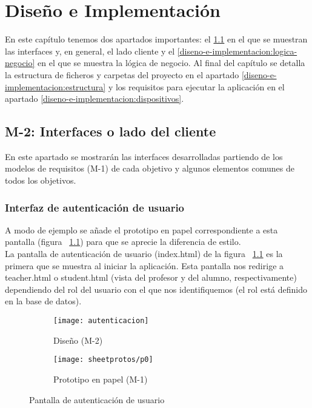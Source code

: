 
\chapter{Diseño e Implementación}
\label{diseno-e-implementacion}

En este capítulo tenemos dos apartados importantes: el \ref{diseno-e-implementacion:interfaces} en el que se muestran las interfaces y, en general, el lado cliente y el \ref{diseno-e-implementacion:logica-negocio} en el que se muestra la lógica de negocio. Al final del capítulo se detalla la estructura de ficheros y carpetas del proyecto en el apartado \ref{diseno-e-implementacion:estructura} y los requisitos para ejecutar la aplicación en el apartado \ref{diseno-e-implementacion:dispositivos}.\\

\section{M-2: Interfaces o lado del cliente}
\label{diseno-e-implementacion:interfaces}

En este apartado se mostrarán las interfaces desarrolladas partiendo de los modelos de requisitos (M-1) de cada objetivo y algunos elementos comunes de todos los objetivos.

\subsection{Interfaz de autenticación de usuario}
\label{diseno-e-implementacion:interfaces:autenticacion}

A modo de ejemplo se añade el prototipo en papel correspondiente a esta pantalla (figura ~\ref{fig:autenticacion:diseno}) para que se aprecie la diferencia de estilo.\\

La pantalla de autenticación de usuario (index.html) de la figura ~\ref{fig:autenticacion:diseno} es la primera que se muestra al iniciar la aplicación. Esta pantalla nos redirige a teacher.html o student.html (vista del profesor y del alumno, respectivamente) dependiendo del rol del usuario con el que nos identifiquemos (el rol está definido en la base de datos).\\

\noindent
\begin{figure}[!htbp]
\begin{subfigure}[t]{0.5\textwidth}
	\centering
	\texttt{[image: autenticacion]}
	\caption{Diseño (M-2)}
    \label{fig:autenticacion:diseno}
\end{subfigure}
%
\begin{subfigure}[t]{0.5\textwidth}
	\centering
	\texttt{[image: sheetprotos/p0]}
	\caption{Prototipo en papel (M-1)}
	\label{fig:autenticacion:proto}
\end{subfigure}
%
\caption{Pantalla de autenticación de usuario}
\label{fig:autenticacion}
\end{figure}

